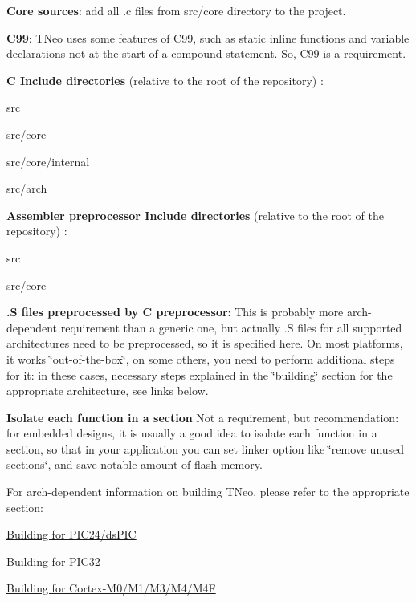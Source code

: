 \begin{DoxyItemize}
\item {\bfseries Core sources}\+: add all {\ttfamily .c} files from {\ttfamily src/core} directory to the project.
\item {\bfseries C99}\+: T\+Neo uses some features of C99, such as {\ttfamily static inline} functions and variable declarations not at the start of a compound statement. So, C99 is a requirement.
\item {\bfseries C Include directories} (relative to the root of the repository) \+:
\begin{DoxyItemize}
\item {\ttfamily src}
\item {\ttfamily src/core}
\item {\ttfamily src/core/internal}
\item {\ttfamily src/arch}
\end{DoxyItemize}
\item {\bfseries Assembler preprocessor Include directories} (relative to the root of the repository) \+:
\begin{DoxyItemize}
\item {\ttfamily src}
\item {\ttfamily src/core}
\end{DoxyItemize}
\item {\bfseries {\ttfamily .S} files preprocessed by C preprocessor}\+: This is probably more arch-\/dependent requirement than a generic one, but actually {\ttfamily .S} files for all supported architectures need to be preprocessed, so it is specified here. On most platforms, it works \char`\"{}out-\/of-\/the-\/box\char`\"{}, on some others, you need to perform additional steps for it\+: in these cases, necessary steps explained in the \char`\"{}building\char`\"{} section for the appropriate architecture, see links below.
\item {\bfseries Isolate each function in a section} Not a requirement, but recommendation\+: for embedded designs, it is usually a good idea to isolate each function in a section, so that in your application you can set linker option like \char`\"{}remove unused sections\char`\"{}, and save notable amount of flash memory.
\end{DoxyItemize}

For arch-\/dependent information on building T\+Neo, please refer to the appropriate section\+:


\begin{DoxyItemize}
\item \hyperlink{arch_specific_pic24_building}{Building for P\+I\+C24/ds\+P\+I\+C}
\item \hyperlink{arch_specific_pic32_building}{Building for P\+I\+C32}
\item \hyperlink{arch_specific_cortex_m_building}{Building for Cortex-\/\+M0/\+M1/\+M3/\+M4/\+M4\+F} 
\end{DoxyItemize}